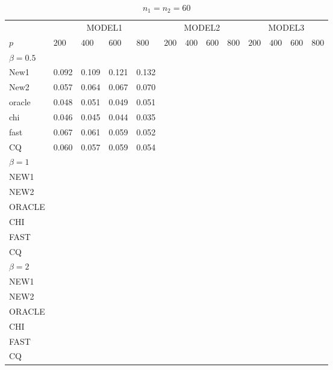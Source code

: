 \documentclass[review]{elsarticle}
\theoremstyle{plain}
\theoremstyle{definition}
\theoremstyle{remark}
\begin{document}
\begin{table}[ht]
\caption{$n_1=n_2=60$} 
\label{hahaha}
\vspace{3mm}
\centering
\begin{tabular}{lllllllllllll}
\toprule
    &   \multicolumn{4}{c}{MODEL1} & \multicolumn{4}{c}{MODEL2}& \multicolumn{4}{c}{MODEL3}  \\
    \cmidrule(r){2-5}
\cmidrule(r){6-9}
\cmidrule(r){10-13}
    $p$ & $200$ & $400$ & $600$ & $800$ & $200$ & $400$ & $600$ & $800$ & $200$ & $400$ & $600$ & $800$ \\ 
\midrule
    $\beta=0.5$\\
New1 & 0.092 & 0.109 & 0.121 & 0.132 \\ 
New2 & 0.057 & 0.064 & 0.067 & 0.070 \\ 
oracle & 0.048 & 0.051 & 0.049 & 0.051 \\ 
chi & 0.046 & 0.045 & 0.044 & 0.035 \\ 
fast & 0.067 & 0.061 & 0.059 & 0.052 \\ 
CQ & 0.060 & 0.057 & 0.059 & 0.054 \\ 
    $\beta=1$&&&&&&\\
    NEW1&&&&&&\\
    NEW2&&&&&&\\
    ORACLE&&&&&&\\
    CHI&&&&&&\\
    FAST&&&&&&\\
    CQ&&&&&&\\
   $\beta=2$&&&&&&\\
    NEW1&&&&&&\\
    NEW2&&&&&&\\
    ORACLE&&&&&&\\
    CHI&&&&&&\\
    FAST&&&&&&\\
    CQ&&&&&&\\
\bottomrule
\end{tabular}
\end{table}



%
\end{document}
